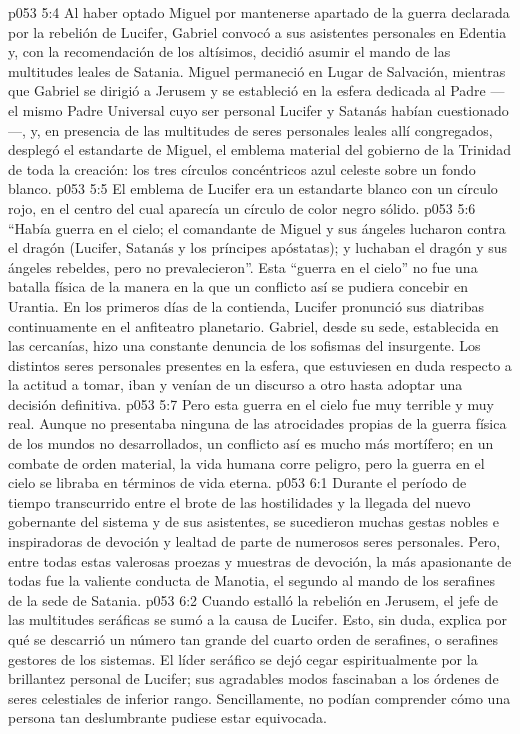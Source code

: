 \vs p053 5:4 \pc Al haber optado Miguel por mantenerse apartado de la guerra declarada por la rebelión de Lucifer, Gabriel convocó a sus asistentes personales en Edentia y, con la recomendación de los altísimos, decidió asumir el mando de las multitudes leales de Satania. Miguel permaneció en Lugar de Salvación, mientras que Gabriel se dirigió a Jerusem y se estableció en la esfera dedicada al Padre ---el mismo Padre Universal cuyo ser personal Lucifer y Satanás habían cuestionado---, y, en presencia de las multitudes de seres personales leales allí congregados, desplegó el estandarte de Miguel, el emblema material del gobierno de la Trinidad de toda la creación: los tres círculos concéntricos azul celeste sobre un fondo blanco.
\vs p053 5:5 El emblema de Lucifer era un estandarte blanco con un círculo rojo, en el centro del cual aparecía un círculo de color negro sólido.
\vs p053 5:6 “Había guerra en el cielo; el comandante de Miguel y sus ángeles lucharon contra el dragón (Lucifer, Satanás y los príncipes apóstatas); y luchaban el dragón y sus ángeles rebeldes, pero no prevalecieron”. Esta “guerra en el cielo” no fue una batalla física de la manera en la que un conflicto así se pudiera concebir en Urantia. En los primeros días de la contienda, Lucifer pronunció sus diatribas continuamente en el anfiteatro planetario. Gabriel, desde su sede, establecida en las cercanías, hizo una constante denuncia de los sofismas del insurgente. Los distintos seres personales presentes en la esfera, que estuviesen en duda respecto a la actitud a tomar, iban y venían de un discurso a otro hasta adoptar una decisión definitiva.
\vs p053 5:7 Pero esta guerra en el cielo fue muy terrible y muy real. Aunque no presentaba ninguna de las atrocidades propias de la guerra física de los mundos no desarrollados, un conflicto así es mucho más mortífero; en un combate de orden material, la vida humana corre peligro, pero la guerra en el cielo se libraba en términos de vida eterna.
\vs p053 6:1 Durante el período de tiempo transcurrido entre el brote de las hostilidades y la llegada del nuevo gobernante del sistema y de sus asistentes, se sucedieron muchas gestas nobles e inspiradoras de devoción y lealtad de parte de numerosos seres personales. Pero, entre todas estas valerosas proezas y muestras de devoción, la más apasionante de todas fue la valiente conducta de Manotia, el segundo al mando de los serafines de la sede de Satania.
\vs p053 6:2 Cuando estalló la rebelión en Jerusem, el jefe de las multitudes seráficas se sumó a la causa de Lucifer. Esto, sin duda, explica por qué se descarrió un número tan grande del cuarto orden de serafines, o serafines gestores de los sistemas. El líder seráfico se dejó cegar espiritualmente por la brillantez personal de Lucifer; sus agradables modos fascinaban a los órdenes de seres celestiales de inferior rango. Sencillamente, no podían comprender cómo una persona tan deslumbrante pudiese estar equivocada.
